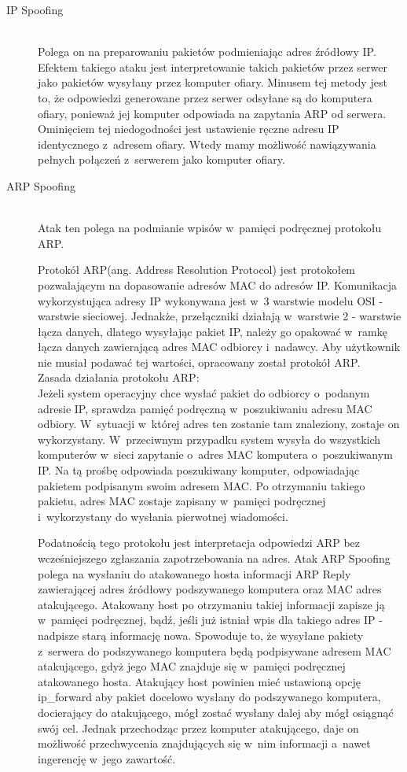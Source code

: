 \documentclass[a4paper,12pt,oneside]{book}
\begin{document}
			\begin{description}
				\item[IP Spoofing]\hfill \\
					Polega on na preparowaniu pakietów podmieniając adres źródłowy IP.
					Efektem takiego ataku jest interpretowanie takich pakietów przez serwer jako pakietów wysyłany przez komputer ofiary.
					Minusem tej metody jest to, że odpowiedzi generowane przez serwer odsyłane są do komputera ofiary, ponieważ jej  komputer odpowiada na zapytania ARP od serwera.\\
					Ominięciem tej niedogodności jest ustawienie ręczne adresu IP identycznego z~adresem ofiary.
					Wtedy mamy możliwość nawiązywania pełnych połączeń z~serwerem jako komputer ofiary.
				\item[ARP Spoofing]\hfill \\
					Atak ten polega na podmianie wpisów w~pamięci podręcznej protokołu ARP.
					
					Protokół ARP(ang. Address Resolution Protocol) jest protokołem pozwalającym na dopasowanie adresów MAC do adresów IP.
					Komunikacja wykorzystująca adresy IP wykonywana jest w~3 warstwie modelu OSI - warstwie sieciowej.
					Jednakże, przełączniki działają w~warstwie 2 - warstwie łącza danych, dlatego wysyłając pakiet IP, należy go opakować w~ramkę łącza danych zawierającą adres MAC odbiorcy i~nadawcy.
					Aby użytkownik nie musiał podawać tej wartości, opracowany został protokół ARP.\\
					Zasada działania protokołu ARP:\\
					Jeżeli system operacyjny chce wysłać pakiet do odbiorcy o~podanym adresie IP, sprawdza pamięć podręczną w~poszukiwaniu adresu MAC odbiory.
					W~sytuacji w~której adres ten zostanie tam znaleziony, zostaje on wykorzystany.
					W~przeciwnym przypadku system wysyła do wszystkich komputerów w~sieci zapytanie o~adres MAC komputera o~poszukiwanym IP.
					Na tą prośbę odpowiada poszukiwany komputer, odpowiadając pakietem podpisanym swoim adresem MAC.
					Po otrzymaniu takiego pakietu, adres MAC zostaje zapisany w~pamięci podręcznej i~wykorzystany do wysłania pierwotnej wiadomości.
					
					Podatnością tego protokołu jest interpretacja odpowiedzi ARP bez wcześniejszego zgłaszania zapotrzebowania na adres.
					Atak ARP Spoofing polega na wysłaniu do atakowanego hosta informacji ARP Reply zawierającej adres źródłowy podszywanego komputera oraz MAC adres atakującego.
					Atakowany host po otrzymaniu takiej informacji zapisze ją w~pamięci podręcznej, bądź, jeśli już istniał wpis dla takiego adres IP - nadpisze starą informację nowa.
					Spowoduje to, że wysyłane pakiety z~serwera do podszywanego komputera będą podpisywane adresem MAC atakującego, gdyż jego MAC znajduje się w~pamięci podręcznej atakowanego hosta.
					Atakujący host powinien mieć ustawioną opcję ip\_forward aby pakiet docelowo wysłany do podszywanego komputera, docierający do atakującego, mógł zostać wysłany dalej aby mógł osiągnąć swój cel.
					Jednak przechodząc przez komputer atakującego, daje on możliwość przechwycenia znajdujących się w~nim informacji a~nawet ingerencję w~jego zawartość.
			\end{description}
\end{document}
